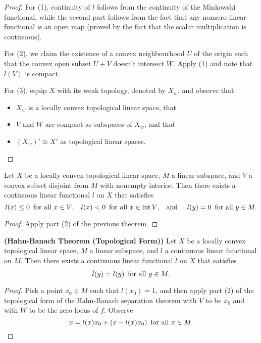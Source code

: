 \begin{proof}
  For (1), continuity of $l$ follows from the continuity of the Minkowski functional, while the second part follows from the fact that any nonzero linear functional is an open map (proved by the fact that the scalar multiplication is continuous).

  For (2), we claim the existence of a convex neighbourhood $U$ of the origin such that the convex open subset $U+V$ doesn't intersect $W$. Apply (1) and note that $l(V)$ is compact.

  For (3), equip $X$ with its weak topology, denoted by $X_w$, and observe that
  \begin{itemize}
    \item $X_w$ is a locally convex topological linear space, that
    \item $V$ and $W$ are compact as subspaces of $X_w$, and that
    \item $(X_w)'\cong X'$ as topological linear spaces.
  \end{itemize}
\end{proof}

\begin{corollary}[Mazur]
  Let $X$ be a locally convex topological linear space, $M$ a linear subspace, and $V$ a convex subset disjoint from $M$ with nonempty interior. Then there exists a continuous linear functional $l$ on $X$ that satisfies
  \begin{equation*}
    l(x) \leq 0\text{\enskip for all }x\in V\text{,\quad}l(x) < 0\text{\enskip for all }x\in \operatorname{int} V\text{,\quad and \quad}l(y) = 0\text{\enskip for all }y\in M.
  \end{equation*}
\end{corollary}

\begin{proof}
  Apply part (2) of the previous theorem.
\end{proof}

\begin{theorem}{\bf (Hahn-Banach Theorem (Topological Form))}
  Let $X$ be a locally convex topological linear space, $M$ a linear subspace, and $l$ a continuous linear functional on $M$. Then there exists a continuous linear functional $\tilde l$ on $X$ that satisfies
  \begin{equation*}
    \tilde l(y)=l(y)\text{\enskip for all }y\in M.
  \end{equation*}
\end{theorem}

\begin{proof}
  Pick a point $x_0\in M$ such that $l(x_0)=1$, and then apply part (2) of the topological form of the Hahn-Banach separation theorem with $V$ to be $x_0$ and with $W$ to be the zero locus of $f$. Observe
  \begin{equation*}
    x=l(x)x_0+(x-l(x)x_0)\text{\enskip lor all }x\in M.
  \end{equation*}
\end{proof}

